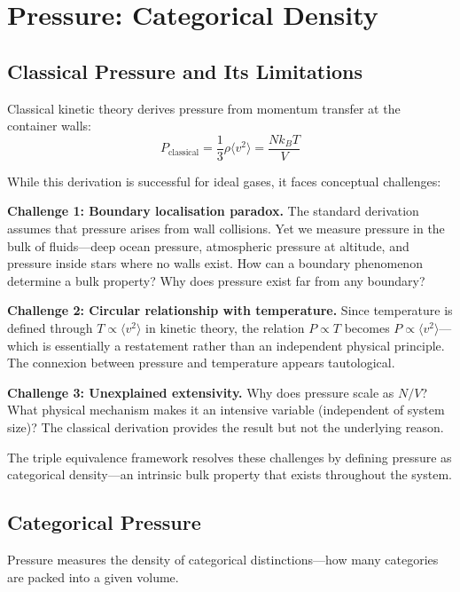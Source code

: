 \section{Pressure: Categorical Density}
\label{sec:pressure}

\subsection{Classical Pressure and Its Limitations}

Classical kinetic theory derives pressure from momentum transfer at the container walls:
\begin{equation}
P_{\text{classical}} = \frac{1}{3}\rho\langle v^2 \rangle = \frac{Nk_B T}{V}
\end{equation}

While this derivation is successful for ideal gases, it faces conceptual challenges:

\textbf{Challenge 1: Boundary localisation paradox.} The standard derivation assumes that pressure arises from wall collisions. Yet we measure pressure in the bulk of fluids—deep ocean pressure, atmospheric pressure at altitude, and pressure inside stars where no walls exist. How can a boundary phenomenon determine a bulk property? Why does pressure exist far from any boundary?

\textbf{Challenge 2: Circular relationship with temperature.} Since temperature is defined through $T \propto \langle v^2 \rangle$ in kinetic theory, the relation $P \propto T$ becomes $P \propto \langle v^2 \rangle$—which is essentially a restatement rather than an independent physical principle. The connexion between pressure and temperature appears tautological.

\textbf{Challenge 3: Unexplained extensivity.} Why does pressure scale as $N/V$? What physical mechanism makes it an intensive variable (independent of system size)? The classical derivation provides the result but not the underlying reason.

The triple equivalence framework resolves these challenges by defining pressure as categorical density—an intrinsic bulk property that exists throughout the system.



\subsection{Categorical Pressure}

Pressure measures the density of categorical distinctions—how many categories are packed into a given volume.

